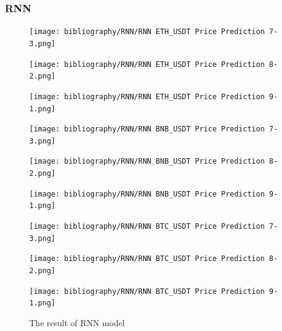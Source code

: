 \documentclass{ieeeojies}
\begin{document}
\subsubsection{RNN}
\begin{figure}[H]
    \centering
    \begin{minipage}{0.15\textwidth}
    \centering
    \texttt{[image: bibliography/RNN/RNN ETH\_USDT Price Prediction 7-3.png]}
    \end{minipage}
    \hfill
    \begin{minipage}{0.15\textwidth}
    \centering
    \texttt{[image: bibliography/RNN/RNN ETH\_USDT Price Prediction 8-2.png]}
    \end{minipage}
    \hfill
    \begin{minipage}{0.15\textwidth}
    \centering
    \texttt{[image: bibliography/RNN/RNN ETH\_USDT Price Prediction 9-1.png]}
    \end{minipage}
    \centering
    \begin{minipage}{0.15\textwidth}
    \centering
    \texttt{[image: bibliography/RNN/RNN BNB\_USDT Price Prediction 7-3.png]}
    \end{minipage}
    \hfill
    \begin{minipage}{0.15\textwidth}
    \centering
    \texttt{[image: bibliography/RNN/RNN BNB\_USDT Price Prediction 8-2.png]}
    \end{minipage}
    \hfill
    \begin{minipage}{0.15\textwidth}
    \centering
    \texttt{[image: bibliography/RNN/RNN BNB\_USDT Price Prediction 9-1.png]}
    \end{minipage}
    \centering
    \begin{minipage}{0.15\textwidth}
    \centering
    \texttt{[image: bibliography/RNN/RNN BTC\_USDT Price Prediction 7-3.png]}
    \end{minipage}
    \hfill
    \begin{minipage}{0.15\textwidth}
    \centering
    \texttt{[image: bibliography/RNN/RNN BTC\_USDT Price Prediction 8-2.png]}
    \end{minipage}
    \hfill
    \begin{minipage}{0.15\textwidth}
    \centering
    \texttt{[image: bibliography/RNN/RNN BTC\_USDT Price Prediction 9-1.png]}
    \end{minipage}
    \caption{The result of RNN model}
    \label{fig:enter-label}
\end{figure}
\end{document}
